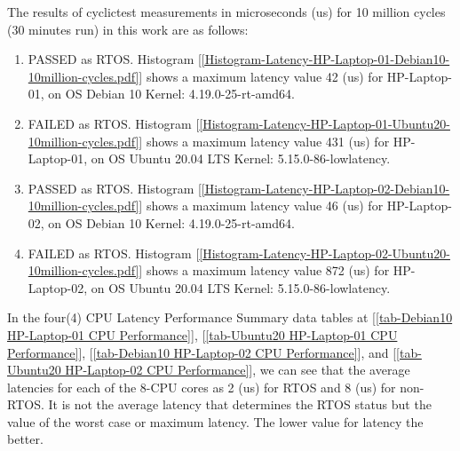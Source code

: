 \noindent
The results of cyclictest measurements in microseconds (us) for 10 million cycles (30 minutes run) in this work are as follows: 

\begin{enumerate}
	\item PASSED as RTOS. Histogram [\ref{Histogram-Latency-HP-Laptop-01-Debian10-10million-cycles.pdf}] shows a maximum latency value 42 (us) for HP-Laptop-01, on OS Debian 10 Kernel: 4.19.0-25-rt-amd64. 
	
	\item FAILED as RTOS. Histogram [\ref{Histogram-Latency-HP-Laptop-01-Ubuntu20-10million-cycles.pdf}] shows a maximum latency value 431 (us) for HP-Laptop-01, on OS Ubuntu 20.04 LTS Kernel: 5.15.0-86-lowlatency. 

	\item PASSED as RTOS. Histogram [\ref{Histogram-Latency-HP-Laptop-02-Debian10-10million-cycles.pdf}] shows a maximum latency value 46 (us) for HP-Laptop-02, on OS Debian 10 Kernel: 4.19.0-25-rt-amd64. 

    \item FAILED as RTOS. Histogram [\ref{Histogram-Latency-HP-Laptop-02-Ubuntu20-10million-cycles.pdf}] shows a maximum latency value 872 (us) for HP-Laptop-02, on OS Ubuntu 20.04 LTS Kernel: 5.15.0-86-lowlatency. 
\end{enumerate}

In the four(4) CPU Latency Performance Summary data tables at 
[\ref{tab-Debian10 HP-Laptop-01 CPU Performance}], 
[\ref{tab-Ubuntu20 HP-Laptop-01 CPU Performance}], 
[\ref{tab-Debian10 HP-Laptop-02 CPU Performance}], and
[\ref{tab-Ubuntu20 HP-Laptop-02 CPU Performance}], we can see that the average latencies for each of the 8-CPU cores as 2 (us) for RTOS and 8 (us) for non-RTOS. It is not the average latency that determines the RTOS status but the value of the worst case or maximum latency. The lower value for latency the  better.

\clearpage
\pagebreak

